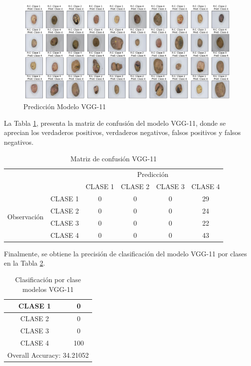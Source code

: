 			\begin{figure}[ht]
				\centering
				\includegraphics[scale=0.4]{Figs/107.png}
				\caption{Predicción Modelo VGG-11}
				\label{fig:Pre_VGG11}
			\end{figure}
			
			La Tabla \ref{fig:MC_VGG11}, presenta la matriz de confusión del modelo VGG-11, donde se aprecian los verdaderos positivos, verdaderos negativos, falsos positivos y falsos negativos.
			
			\newpage
			\begin{table}[htbp]
				\centering
				\begin{tabular}{|c|l|c|c|c|c|}
					\hline
					\multicolumn{2}{|c|}{\multirow{2}[4]{*}{}} & \multicolumn{4}{c|}{Predicción} \bigstrut\\
					\cline{3-6}    \multicolumn{2}{|c|}{} & CLASE 1 & CLASE 2 & CLASE 3 & CLASE 4 \bigstrut\\
					\hline
					\multirow{4}[8]{*}{\begin{sideways}Observación\end{sideways}} & CLASE 1 & 0     & 0     & 0    & 29 \bigstrut\\
					\cline{2-6}     & CLASE 2 & 0     & 0     & 0    & 24 \bigstrut\\
					\cline{2-6}      & CLASE 3 & 0     & 0     & 0    & 22 \bigstrut\\
					\cline{2-6}     & CLASE 4 & 0     & 0     & 0    & 43 \bigstrut\\
					\hline
				\end{tabular}%
				\caption{Matriz de confusión VGG-11}
				\label{fig:MC_VGG11}
			\end{table}%
						
			Finalmente, se obtiene la precisión de clasificación del modelo VGG-11 por clases en la Tabla \ref{fig:clase_VGG11}.
			
			\begin{table}[ht]
				\centering
				\begin{tabular}{|c|c|}
					\hline
					CLASE 1 & 0 \bigstrut\\
					\hline
					CLASE 2 & 0 \bigstrut\\
					\hline
					CLASE 3 & 0 \bigstrut\\
					\hline
					CLASE 4 & 100 \bigstrut\\
					\hline
					\multicolumn{2}{|c|}{Overall Accuracy: 34.21052} \bigstrut\\
					\hline
				\end{tabular}%
				\caption{Clasificación por clase modelos VGG-11}
				\label{fig:clase_VGG11}
			\end{table}%
			
